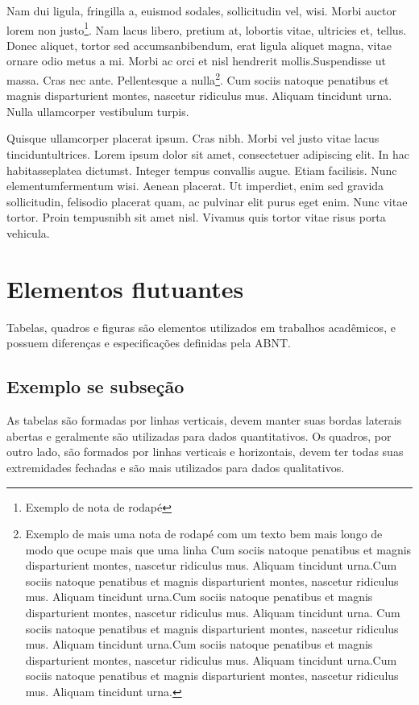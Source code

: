 \documentclass{jornada} %
\begin{document}
Nam dui ligula, fringilla a, euismod sodales, sollicitudin vel, wisi. Morbi auctor lorem non justo\footnote{Exemplo de nota de rodapé }. Nam lacus libero, pretium at, lobortis vitae, ultricies et, tellus.  Donec aliquet, tortor sed accumsanbibendum, erat ligula aliquet magna, vitae ornare odio metus a mi. Morbi ac orci et nisl hendrerit mollis.Suspendisse ut massa. Cras nec ante. Pellentesque a nulla\footnote{Exemplo de mais uma nota de rodapé com um texto bem mais longo de modo que ocupe mais que uma linha Cum sociis natoque penatibus et magnis disparturient montes, nascetur ridiculus mus. Aliquam tincidunt urna.Cum sociis natoque penatibus et magnis disparturient montes, nascetur ridiculus mus. Aliquam tincidunt urna.Cum sociis natoque penatibus et magnis disparturient montes, nascetur ridiculus mus. Aliquam tincidunt urna. Cum sociis natoque penatibus et magnis disparturient montes, nascetur ridiculus mus. Aliquam tincidunt urna.Cum sociis natoque penatibus et magnis disparturient montes, nascetur ridiculus mus. Aliquam tincidunt urna.Cum sociis natoque penatibus et magnis disparturient montes, nascetur ridiculus mus. Aliquam tincidunt urna.}. Cum sociis natoque penatibus et magnis disparturient montes, nascetur ridiculus mus. Aliquam tincidunt urna. Nulla ullamcorper vestibulum turpis. 
\begin{citacao}
 Quisque ullamcorper placerat ipsum. Cras nibh. Morbi vel justo vitae lacus tinciduntultrices.  Lorem ipsum dolor sit amet, consectetuer adipiscing elit.  In hac habitasseplatea dictumst.  Integer tempus convallis augue.  Etiam facilisis.  Nunc elementumfermentum wisi.  Aenean placerat.  Ut imperdiet, enim sed gravida sollicitudin, felisodio placerat quam, ac pulvinar elit purus eget enim. Nunc vitae tortor. Proin tempusnibh sit amet nisl. Vivamus quis tortor vitae risus porta vehicula.
\end{citacao}

\lipsum[5]

\section{Elementos flutuantes}
Tabelas, quadros e figuras são elementos utilizados em trabalhos acadêmicos, e possuem diferenças e especificações definidas pela ABNT.

\subsection{Exemplo se subseção}
As tabelas são formadas por linhas verticais, devem manter suas bordas laterais abertas e geralmente são utilizadas para dados quantitativos. Os quadros, por outro lado, são formados por linhas verticais e horizontais, devem ter todas suas extremidades fechadas e são mais utilizados para dados qualitativos.
\end{document}
